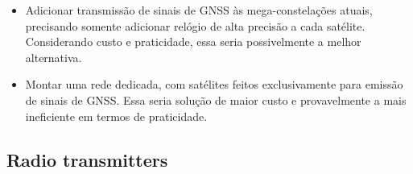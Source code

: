 \begin{itemize}
    \item Adicionar transmissão de sinais de GNSS às mega-constelações atuais, precisando somente adicionar relógio de alta precisão a cada satélite. Considerando custo e praticidade, essa seria possivelmente a melhor alternativa.
    \item Montar uma rede dedicada, com satélites feitos exclusivamente para emissão de sinais de GNSS. Essa seria solução de maior custo e provavelmente a mais ineficiente em termos de praticidade.
\end{itemize}

\subsection{Radio transmitters}





